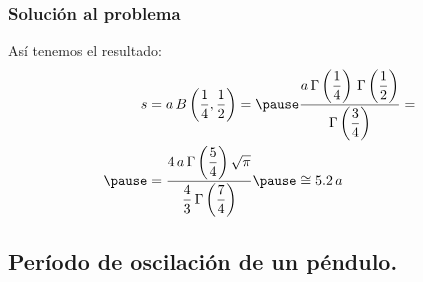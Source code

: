 \documentclass[12pt]{beamer}
\begin{document}
\begin{frame}
\frametitle{Solución al problema}
Así tenemos el resultado:
\begin{eqnarray*}
\begin{aligned}
s &= a \, B\left(\dfrac{1}{4}, \dfrac{1}{2} \right) = \pause \dfrac{a \, \Gamma \left( \dfrac{1}{4} \right) \, \Gamma \left( \dfrac{1}{2} \right) }{\Gamma \left( \dfrac{3}{4} \right)} = \\ \pause
&= \dfrac{4 \, a \, \Gamma \left( \dfrac{5}{4} \right) \sqrt{\pi}}{\dfrac{4}{3} \, \Gamma \left( \dfrac{7}{4} \right)} \pause \cong 5.2 \, a
\end{aligned}
\end{eqnarray*}
\end{frame}

\subsection{Período de oscilación de un péndulo.}
\end{document}
